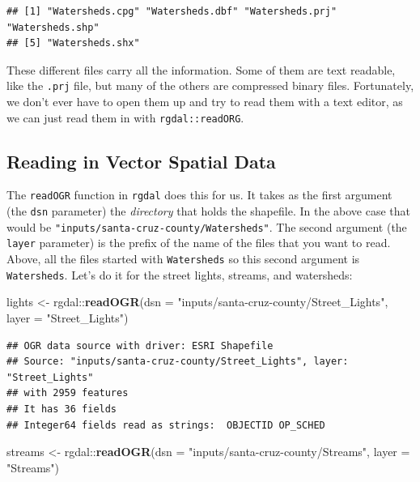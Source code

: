 \documentclass[]{book}
\newenvironment{Shaded}{\begin{snugshade}}{\end{snugshade}}
\newcommand{\KeywordTok}[1]{\textcolor[rgb]{0.13,0.29,0.53}{\textbf{{#1}}}}
\newcommand{\DataTypeTok}[1]{\textcolor[rgb]{0.13,0.29,0.53}{{#1}}}
\newcommand{\StringTok}[1]{\textcolor[rgb]{0.31,0.60,0.02}{{#1}}}
\newcommand{\NormalTok}[1]{{#1}}
\theoremstyle{definition}
\theoremstyle{definition}
\theoremstyle{remark}
\begin{document}
\begin{verbatim}
## [1] "Watersheds.cpg" "Watersheds.dbf" "Watersheds.prj" "Watersheds.shp"
## [5] "Watersheds.shx"
\end{verbatim}

These different files carry all the information. Some of them are text
readable, like the \texttt{.prj} file, but many of the others are
compressed binary files. Fortunately, we don't ever have to open them up
and try to read them with a text editor, as we can just read them in
with \texttt{rgdal::readORG}.

\subsection{Reading in Vector Spatial
Data}\label{reading-in-vector-spatial-data}

The \texttt{readOGR} function in \texttt{rgdal} does this for us. It
takes as the first argument (the \texttt{dsn} parameter) the
\emph{directory} that holds the shapefile. In the above case that would
be \texttt{"inputs/santa-cruz-county/Watersheds"}. The second argument
(the \texttt{layer} parameter) is the prefix of the name of the files
that you want to read. Above, all the files started with
\texttt{Watersheds} so this second argument is \texttt{Watersheds}.
Let's do it for the street lights, streams, and watersheds:

\begin{Shaded}
\begin{Highlighting}[]
\NormalTok{lights <-}\StringTok{ }\NormalTok{rgdal::}\KeywordTok{readOGR}\NormalTok{(}\DataTypeTok{dsn =} \StringTok{"inputs/santa-cruz-county/Street_Lights"}\NormalTok{, }\DataTypeTok{layer =} \StringTok{"Street_Lights"}\NormalTok{)}
\end{Highlighting}
\end{Shaded}

\begin{verbatim}
## OGR data source with driver: ESRI Shapefile 
## Source: "inputs/santa-cruz-county/Street_Lights", layer: "Street_Lights"
## with 2959 features
## It has 36 fields
## Integer64 fields read as strings:  OBJECTID OP_SCHED
\end{verbatim}

\begin{Shaded}
\begin{Highlighting}[]
\NormalTok{streams <-}\StringTok{ }\NormalTok{rgdal::}\KeywordTok{readOGR}\NormalTok{(}\DataTypeTok{dsn =} \StringTok{"inputs/santa-cruz-county/Streams"}\NormalTok{, }\DataTypeTok{layer =} \StringTok{"Streams"}\NormalTok{)}
\end{Highlighting}
\end{Shaded}
\end{document}
